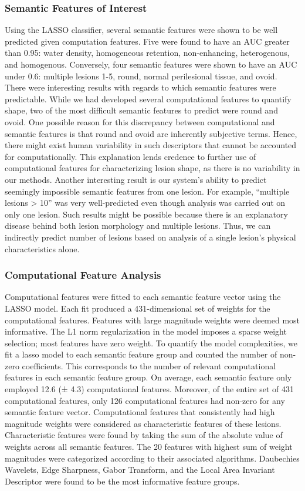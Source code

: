 \clearpage


\subsubsection{Semantic Features of Interest}
Using the LASSO classifier, several semantic features were shown to be well predicted given computation features. Five were found to have an AUC greater than 0.95: water density, homogeneous retention, non-enhancing, heterogenous, and homogenous.
Conversely, four semantic features were shown to have an AUC under 0.6: multiple lesions 1-5, round, normal perilesional tissue, and ovoid.
There were interesting results with regards to which semantic features were predictable. While we had developed several computational features to quantify shape, two of the most difficult semantic features to predict were round and ovoid. One possible reason for this discrepancy between computational and semantic features is that round and ovoid are inherently subjective terms. Hence, there might exist human variability in such descriptors that cannot be accounted for computationally. This explanation lends credence to further use of computational features for characterizing lesion shape, as there is no variability in our methods.
Another interesting result is our system's ability to predict seemingly impossible semantic features from one lesion. For example, “multiple lesions > 10” was very well-predicted even though analysis was carried out on only one lesion. Such results might be possible because there is an explanatory disease behind both lesion morphology and multiple lesions. Thus, we can indirectly predict number of lesions based on analysis of a single lesion's physical characteristics alone.

\subsubsection{Computational Feature Analysis}
Computational features were fitted to each semantic feature vector using the LASSO model. Each fit produced a 431-dimensional set of weights for the computational features. Features with large magnitude weights were deemed most informative.  The L1 norm regularization in the model imposes a sparse weight selection; most features have zero weight. To quantify the model complexities, we fit a lasso model to each semantic feature group and counted the number of non-zero coefficients. This corresponds to the number of relevant computational features in each semantic feature group. On average, each semantic feature only employed 12.6 (± 4.3) computational features. Moreover, of the entire set of 431 computational features, only 126 computational features had non-zero for any semantic feature vector. 
Computational features that consistently had high magnitude weights were considered as characteristic features of these lesions. Characteristic features were found by taking the sum of the absolute value of weights across all semantic features. The 20 features with highest sum of weight magnitudes were categorized according to their associated algorithms. Daubechies Wavelets, Edge Sharpness, Gabor Transform, and the Local Area Invariant Descriptor were found to be the most informative feature groups.

